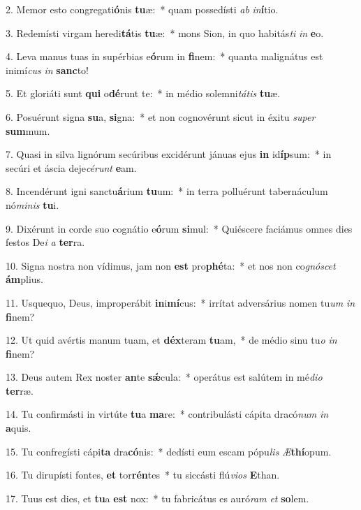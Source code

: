 2. Memor esto congregati\textbf{ó}nis \textbf{tu}æ:~*  quam possedísti \textit{ab} \textit{in}\textbf{í}tio.\

3. Redemísti virgam heredi\textbf{tá}tis \textbf{tu}æ:~*  mons Sion, in quo habitás\textit{ti} \textit{in} \textbf{e}o.\

4. Leva manus tuas in supérbias e\textbf{ó}rum in \textbf{fi}nem:~*  quanta malignátus est inimí\textit{cus} \textit{in} \textbf{sanc}to!\

5. Et gloriáti sunt \textbf{qui} o\textbf{dé}runt te:~*  in médio solemni\textit{tá}\textit{tis} \textbf{tu}æ.\

6. Posuérunt signa \textbf{su}a, \textbf{si}gna:~*  et non cognovérunt sicut in éxitu \textit{su}\textit{per} \textbf{sum}mum.\

7. Quasi in silva lignórum secúribus excidérunt jánuas ejus \textbf{in} id\textbf{íp}sum:~*  in secúri et áscia deje\textit{cé}\textit{runt} \textbf{e}am.\

8. Incendérunt igni sanctu\textbf{á}rium \textbf{tu}um:~*  in terra polluérunt tabernáculum nó\textit{mi}\textit{nis} \textbf{tu}i.\

9. Dixérunt in corde suo cognátio e\textbf{ó}rum \textbf{si}mul:~*  Quiéscere faciámus omnes dies festos De\textit{i} \textit{a} \textbf{ter}ra.\

10. Signa nostra non vídimus, jam non \textbf{est} pro\textbf{phé}ta:~*  et nos non co\textit{gnó}\textit{scet} \textbf{ám}plius.\

11. Usquequo, Deus, improperábit \textbf{in}i\textbf{mí}cus:~*  irrítat adversárius nomen tu\textit{um} \textit{in} \textbf{fi}nem?\

12. Ut quid avértis manum tuam, et \textbf{déx}teram \textbf{tu}am,~*  de médio sinu tu\textit{o} \textit{in} \textbf{fi}nem?\

13. Deus autem Rex noster \textbf{an}te \textbf{sǽ}cula:~*  operátus est salútem in mé\textit{di}\textit{o} \textbf{ter}ræ.\

14. Tu confirmásti in virtúte \textbf{tu}a \textbf{ma}re:~*  contribulásti cápita dracó\textit{num} \textit{in} \textbf{a}quis.\

15. Tu confregísti cápi\textbf{ta} dra\textbf{có}nis:~*  dedísti eum escam pópu\textit{lis} \textit{Æ}\textbf{thí}opum.\

16. Tu dirupísti fontes, \textbf{et} tor\textbf{rén}tes~*  tu siccásti flú\textit{vi}\textit{os} \textbf{E}than.\

17. Tuus est dies, et \textbf{tu}a \textbf{est} nox:~*  tu fabricátus es auró\textit{ram} \textit{et} \textbf{so}lem.\

